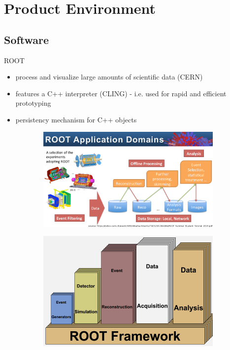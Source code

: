 \section{Product Environment}

\subsection{Software}
\begin{frame}{ROOT}
    \begin{itemize}
      \item process and visualize large amounts of scientific data (CERN)
      \item features a C++ interpreter (CLING) - i.e. used for rapid and efficient prototyping
      \item persistency mechanism for C++ objects
    \end{itemize}


  \begin{figure}[htb]
    \centering
    \begin{subfigure}[b]{0.5\textwidth}
           \includegraphics[width=0.97\linewidth, keepaspectratio]{./resources/root_application_domains.png}
           \nocite{cern:tut}
    \end{subfigure}%
    \begin{subfigure}[b]{0.5\textwidth}
          \includegraphics[width=0.97\linewidth, keepaspectratio]{./resources/root_application_domains2.png}
          \nocite{cern:domains}
    \end{subfigure}
  \end{figure}
\end{frame}


